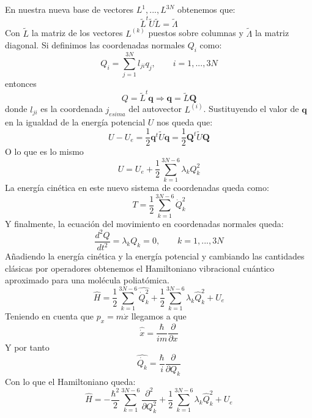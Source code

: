 \documentclass[a4paper]{article}
\begin{document}
En nuestra nueva base de vectores $L^{1},...,L^{3N}$ obtenemos que:
\begin{equation}
\tilde L^t\tilde U\tilde L = \tilde \Lambda
\end{equation}
Con $\tilde L$ la matriz de los vectores $L^{(k)}$ puestos sobre columnas y $\tilde \Lambda$ la matriz diagonal. Si definimos las coordenadas normales $Q_i$ como:
\begin{equation}
Q_i=\sum_{j=1}^{3N}l_{ji}q_j, \qquad i=1,...,3N
\end{equation}
entonces
\begin{equation}
Q = \tilde L^t\boldsymbol q \Rightarrow \boldsymbol q = \tilde L\boldsymbol Q
\end{equation}
donde $l_{ji}$ es la coordenada $j_{esima}$ del autovector $L^{(i)}$. Sustituyendo el valor de $\boldsymbol q$ en la igualdad de la energía potencial $U$ nos queda que:
\begin{equation}
U-U_e=\frac{1}{2}\boldsymbol q^t\tilde U \boldsymbol q = \frac{1}{2}\boldsymbol Q^t\tilde U \boldsymbol Q
\end{equation}
O lo que es lo mismo
\begin{equation}
U=U_e + \frac{1}{2}\sum_{k=1}^{3N-6}\lambda_kQ_k^2
\end{equation}
La energía cinética en este nuevo sistema de coordenadas queda como:
\begin{equation}
T=\frac{1}{2}\sum_{k=1}^{3N-6}\dot Q_k^2
\end{equation}
Y finalmente, la ecuación del movimiento en coordenadas normales queda:
\begin{equation}
\frac{d^2Q}{dt^2}=\lambda_kQ_k=0, \qquad k=1,...,3N
\end{equation}
Añadiendo la energía cinética y la energía potencial y cambiando las cantidades clásicas por operadores obtenemos el Hamiltoniano vibracional cuántico aproximado para una molécula poliatómica.
\begin{equation}
\hat H= \frac{1}{2}\sum_{k=1}^{3N-6} \hat{\dot Q_k^2} + \frac{1}{2} \sum_{k=1}^{3N-6} \lambda_k \hat Q_k^2 + U_e
\end{equation}
Teniendo en cuenta que $p_x=m\dot x$ llegamos a que
$$\hat{\dot{x}}=\frac{\hbar}{im}\frac{\partial}{\partial x}$$
Y por tanto
\begin{equation}
\hat{\dot{Q_k}}=\frac{\hbar}{i}\frac{\partial}{\partial Q_k}
\end{equation}
Con lo que el Hamiltoniano queda:
\begin{equation}
\hat H= -\frac{\hbar^2}{2}\sum_{k=1}^{3N-6} \frac{\partial^2}{\partial Q^2_k} + \frac{1}{2} \sum_{k=1}^{3N-6} \lambda_k \hat Q_k^2 + U_e
\end{equation}
\end{document}
